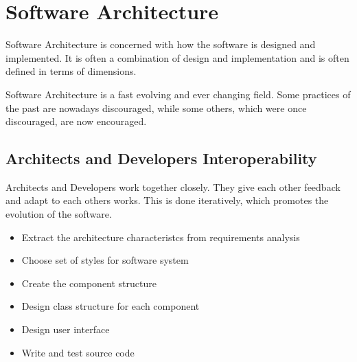 \documentclass[
../../Software_Engineering_Summary.tex,
]
{subfiles}
\begin{document}
\section{Software Architecture}
Software Architecture is concerned with how the software is designed and implemented. It is often a combination of design and implementation and is often defined in terms of dimensions. 

Software Architecture is a fast evolving and ever changing field. Some practices of the past are nowadays discouraged, while some others, which were once discouraged, are now encouraged.

\subsection{Architects and Developers Interoperability}
Architects and Developers work together closely. They give each other feedback and adapt to each others works. This is done iteratively, which promotes the evolution of the software.

\begin{defbox}
    [Architects]
    \begin{itemize}
        \item Extract the architecture characteristcs from requirements analysis
        \item Choose set of styles for software system
        \item Create the component structure
    \end{itemize}
\end{defbox}

\begin{defbox}
    [Developers]
    \begin{itemize}
        \item Design class structure for each component
        \item Design user interface
        \item Write and test source code
    \end{itemize}
\end{defbox}
\end{document}

